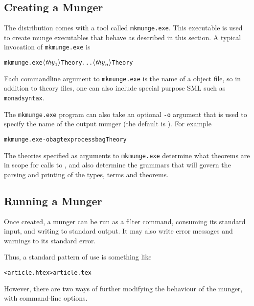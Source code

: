 \subsection{Creating a Munger}
\label{sec:munger-creation}

\newcommand{\mkmunge}{\texttt{mkmunge.exe}}
%
The \HOL{} distribution comes with a tool called \mkmunge.
%
This executable is used to create munge executables that behave as described in this section.
%
A typical invocation of \mkmunge{} is
\begin{alltt}
   \mkmunge \(\langle\mathit{thy}\sb{1}\rangle\)Theory ... \(\langle\mathit{thy}\sb{n}\rangle\)Theory
\end{alltt}
Each commandline argument to \mkmunge{} is the name of a \HOL{} object file, so in addition to theory files, one can also include special purpose SML such as \texttt{monadsyntax}.

The \mkmunge{} program can also take an optional \texttt{-o} argument that is used to specify the name of the output munger (the default is \munge).  For example
\begin{alltt}
   \mkmunge -o bagtexprocess bagTheory
\end{alltt}

The theories specified as arguments to \mkmunge{} determine what theorems are in scope for calls to \holthm, and also determine the grammars that will govern the parsing and printing of the \HOL{} types, terms and theorems.


\subsection{Running a Munger}
\label{sec:running-munger}

Once created, a munger can be run as a filter command, consuming its
standard input, and writing to standard output.
%
It may also write error messages and warnings to its standard error.

Thus, a standard pattern of use is something like
\begin{alltt}
   \munge < article.htex > article.tex
\end{alltt}

However, there are two ways of further modifying the behaviour of the
munger, with command-line options.

